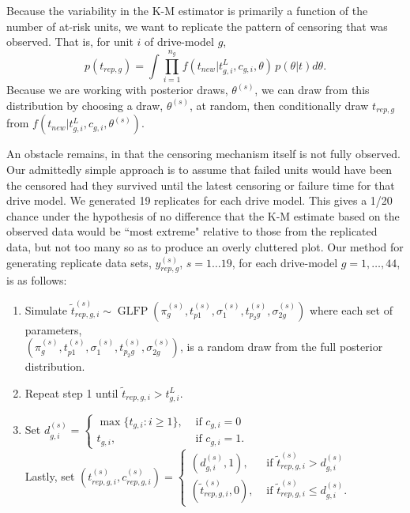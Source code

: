 \documentclass[12pt]{article}
\newcommand{\op}{\operatorname}
\begin{document}
Because the variability in the K-M estimator is primarily a function of the number of at-risk units, we want to replicate the pattern of censoring that was observed. That is, for unit $i$ of drive-model $g$,
$$p(t_{rep,g}) = \int \prod_{i=1}^{n_g}f(t_{new}|t_{g,i}^L,c_{g,i},\theta)\,p(\theta|t)d\theta.$$
Because we are working with posterior draws, $\theta^{(s)}$, we can draw from this distribution by choosing a draw, $\theta^{(s)}$, at random, then conditionally draw $t_{rep,g}$ from $f(t_{new}|t_{g,i}^L,c_{g,i},\theta^{(s)}).$

An obstacle remains, in that the censoring mechanism itself is not fully observed. Our admittedly simple approach is to assume that failed units would have been the censored had they survived until the latest censoring or failure time for that drive model. We generated 19 replicates for each drive model. This gives a 1/20 chance under the hypothesis of no difference that the K-M estimate based on the observed data would be ``most extreme" relative to those from the replicated data, but not too many so as to produce an overly cluttered plot. Our method for generating replicate data sets, $y_{rep,g}^{(s)}$, $s = 1 \dots 19$, for each drive-model $g=1,\ldots,44$, is as follows:
\begin{enumerate}
\item Simulate $\tilde{t}_{rep,g,i}^{(s)} \sim \op{GLFP}(\pi_{g}^{(s)},t_{p1}^{(s)},\sigma_1^{(s)},t_{p_{2}g}^{(s)}, \sigma_{2g}^{(s)})$ where each set of parameters, \\$\left( \pi_{g}^{(s)},t_{p1}^{(s)},\sigma_1^{(s)},t_{p_{2}g}^{(s)}, \sigma_{2g}^{(s)} \right)$, is a random draw from the full posterior distribution.
\item Repeat step 1 until $\tilde{t}_{rep,g,i} > t_{g,i}^L$.
\item Set $d_{g,i}^{(s)}= \begin{cases} \max \{t_{g,i}: i \ge 1\}, & \mbox{ if }c_{g,i}=0\\
t_{g,i}, & \mbox{ if }c_{g, i}=1. \end{cases}$\\
Lastly, set $(t_{rep,g,i}^{(s)},c_{rep,g,i}^{(s)}) = \begin{cases}
  (d_{g,i}^{(s)},1), & \mbox{ if } \tilde{t}_{rep,g,i}^{(s)}>d_{g,i}^{(s)}\\
  (\tilde{t}_{rep,g,i}^{(s)},0), & \mbox{ if }\tilde{t}_{rep,g,i}^{(s)} \le d_{g,i}^{(s)}.
\end{cases}$
\end{enumerate}
\end{document}
